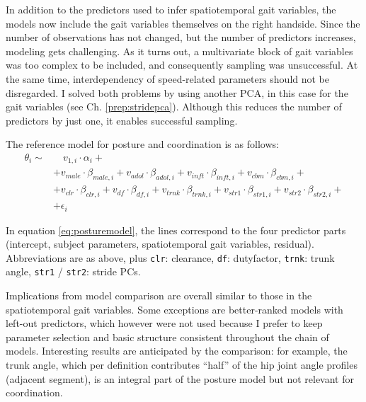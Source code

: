 In addition to the predictors used to infer spatiotemporal gait variables, the models now include the gait variables themselves on the right handside.
Since the number of observations has not changed, but the number of predictors increases, modeling gets challenging.
As it turns out, a multivariate block of gait variables was too complex to be included, and consequently sampling was unsuccessful.
At the same time, interdependency of speed-related parameters should not be disregarded.
I solved both problems by using another PCA, in this case for the gait variables (see Ch. \ref{prep:stridepca}).
Although this reduces the number of predictors by just one, it enables successful sampling.

The reference model for posture and coordination is as follows:
\begin{equation}
\begin{split}
 \theta_{i}  \sim &\quad v_{1,i}\cdot\alpha_{i} +
\\ & + v_{male}\cdot\beta_{male,i} + v_{adol}\cdot\beta_{adol,i} + v_{inft}\cdot\beta_{inft,i} + v_{cbm}\cdot\beta_{cbm,i} +
\\ & + v_{clr}\cdot\beta_{clr,i} + v_{df}\cdot\beta_{df,i} + v_{trnk}\cdot\beta_{trnk,i} + v_{str1}\cdot\beta_{str1,i} + v_{str2}\cdot\beta_{str2,i} +
\\ & + \epsilon_{i}
\end{split}
 \label{eq:posturemodel} \end{equation}

In equation \eqref{eq:posturemodel}, the lines correspond to the four predictor parts (intercept, subject parameters, spatiotemporal gait variables, residual).
Abbreviations are as above, plus \texttt{clr}: clearance, \texttt{df}: dutyfactor, \texttt{trnk}: trunk angle, \texttt{str1} / \texttt{str2}: stride PCs.



Implications from model comparison are overall similar to those in the spatiotemporal gait variables.
Some exceptions are better-ranked models with left-out predictors, which however were not used because I prefer to keep parameter selection and basic structure consistent throughout the chain of models.
Interesting results are anticipated by the comparison: for example, the trunk angle, which per definition contributes ``half'' of the hip joint angle profiles (adjacent segment), is an integral part of the posture model but not relevant for coordination.

